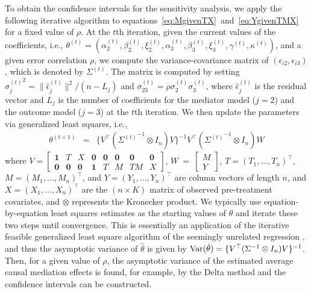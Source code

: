 \documentclass[11pt,letterpaper]{article}
\theoremstyle{plain}
\providecommand{\norm}[1]{\lVert#1\rVert}
\renewcommand\r{\right}
\renewcommand\l{\left}
\newcommand\var{{\rm Var}}
\begin{document}
To obtain the confidence intervals for the sensitivity analysis, we
apply the following iterative algorithm to
equations~\eqref{eq:MgivenTX}~and~\eqref{eq:YgivenTMX} for a fixed
value of $\rho$.  At the $t$th iteration, given the current values of
the coefficients, i.e., $\theta^{(t)}=(\alpha_2^{(t)}, \beta_2^{(t)},
\xi_2^{(t)}, \alpha_3^{(t)},
\beta_3^{(t)},\xi_3^{(t)},\gamma^{(t)},\kappa^{(t)})$, and a given
error correlation $\rho$, we compute the variance-covariance matrix of
$(\epsilon_{i2},\epsilon_{i3})$, which is denoted by $\Sigma^{(t)}$.
The matrix is computed by setting
${\sigma_j^{(t)}}^2=\norm{\hat{\epsilon}_j^{(t)}}^2/(n-L_j)$ and
$\sigma_{23}^{(t)}=\rho \sigma_2^{(t)}\sigma_3^{(t)}$, where
$\hat\epsilon_j^{(t)}$ is the residual vector and $L_j$ is the number
of coefficients for the mediator model ($j=2$) and the outcome model
($j=3$) at the $t$th iteration.  We then update the parameters via
generalized least squares, i.e.,
\begin{eqnarray*}
  \theta^{(t+1)} & = & \{V^\top ({\Sigma^{(t)}}^{-1} \otimes I_n)V\}^{-1}
  V^\top ({\Sigma^{(t)}}^{-1} \otimes I_n)W
\end{eqnarray*}
where
$V  =  \l[\begin{array}{cccccccc} \mathbf{1} &  T & X & \mathbf{0} & \mathbf{0} & \mathbf{0} & \mathbf{0} & \mathbf{0} \\
  \mathbf{0} & \mathbf{0} & \mathbf{0} & \mathbf{1} & T & M & TM & X
\end{array} \r]$,
$W \ = \ \l[\begin{array}{c} M \\
  Y
\end{array} \r]$, $T=(T_1,\dots,T_n)^\top$, $M=(M_1,\dots,M_n)^\top$, and
$Y=(Y_1,\dots,Y_n)^\top$ are column vectors of length $n$, and $X = (X_1, \dots, X_n)^\top$ are the $(n \times K)$ matrix of observed pre-treatment covariates, and $\otimes$ represents the Kronecker product. We typically use
equation-by-equation least squares estimates as the starting values of $\theta$
and iterate these two steps until convergence.  This is essentially an
application of the iterative feasible generalized least square algorithm of the
seemingly unrelated regression \citep{zell:62}, and thus the asymptotic variance
of $\hat\theta$ is given by $\var(\hat\theta) = \{V^\top (\Sigma^{-1} \otimes
I_n) V\}^{-1}$. Then, for a given value of $\rho$, the asymptotic variance of the estimated average causal mediation effects
is found, for example, by the Delta method and the confidence intervals can be constructed.
\end{document}
